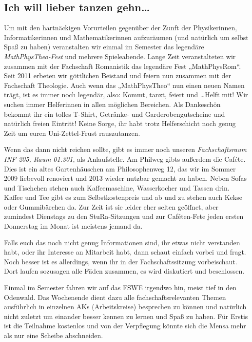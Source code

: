 \subsection{Ich will lieber tanzen gehn\dots}
Um mit den hartnäckigen Vorurteilen gegenüber der Zunft der Physikerinnen, Informatikerinnen und Mathematikerinnen aufzuräumen (und natürlich um selbst Spaß zu haben) veranstalten wir einmal im Semester das legendäre \emph{MathPhysTheo-Fest} und mehrere Spieleabende. Lange Zeit veranstalteten wir zusammen mit der Fachschaft Romanistik das legendäre Fest „MathPhysRom“. Seit 2011 erbeten wir göttlichen Beistand und feiern nun zusammen mit der Fachschaft Theologie. Auch wenn das „MathPhysTheo“ nun einen neuen Namen trägt, ist es immer noch legendär, also: Kommt, tanzt, feiert und \dots Helft mit! Wir suchen immer Helferinnen in allen möglichen Bereichen. Als Dankeschön bekommt ihr ein tolles T-Shirt, Getränke- und Garderobengutscheine und natürlich freien Eintritt! Keine Sorge, ihr habt trotz Helferschicht noch genug Zeit um euren Uni-Zettel-Frust rauszutanzen.

Wenn das dann nicht reichen sollte, gibt es immer noch unseren \emph{Fachschaftsraum INF 205, Raum 01.301}, als Anlaufstelle. Am Philweg gibts außerdem die Caféte. Dies ist ein altes Gartenhäuschen am Philosophenweg 12, das wir im Sommer 2009 liebevoll renoviert und 2013 wieder nutzbar gemacht zu haben. Neben Sofas und Tischchen stehen auch Kaffeemaschine, Wasserkocher und Tassen drin. Kaffee und Tee gibt es zum Selbstkostenpreis und ab und zu stehen auch Kekse oder Gummibärchen da. Zur Zeit ist sie leider eher selten geöffnet, aber zumindest Dienstags zu den \gls{StuRa}-Sitzungen und zur Caféten-Fete jeden ersten Donnerstag im Monat ist meistens jemand da.

Falls euch das noch nicht genug Informationen sind, ihr etwas nicht verstanden habt, oder ihr Interesse an Mitarbeit habt, dann schaut einfach vorbei und fragt. Noch besser ist es allerdings, wenn ihr in der Fachschaftssitzung vorbeischaut. Dort laufen sozusagen alle Fäden zusammen, es wird diskutiert und beschlossen.

Einmal im Semester fahren wir auf das \gls{FSWE} irgendwo hin, meist tief in den Odenwald. Das Wochenende dient dazu alle fachschaftsrelevanten Themen ausführlich in einzelnen AKs (Arbeitskreise) besprechen zu können und natürlich nicht zuletzt um einander besser kennen zu lernen und Spaß zu haben. Für Erstis ist die Teilnahme kostenlos und von der Verpflegung könnte sich die Mensa mehr als nur eine Scheibe abschneiden.
